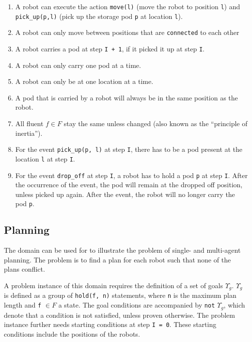 \documentclass[runningheads]{llncs}
\begin{document}
\begin{enumerate}%
        \item  A robot can execute the action \verb|move(l)| (move the robot to position \verb|l|) and \linebreak \verb|pick_up(p,l)| (pick up the storage pod \verb|p| at location \verb|l|).
        \item  A robot can only move between positions that are \verb|connected| to each other
        \item A robot carries a pod at step \verb|I + 1|, if it picked it up at step \verb|I|.
        \item A robot can only carry one pod at a time. 
        \item A robot can only be at one location at a time.
        \item A pod that is carried by a robot will always be in the same position as the robot.
        \item All fluent $f \in F$ stay the same unless changed (also known as the ``principle of inertia'').
        \item For the event \verb|pick_up(p, l)| at step  \verb|I|, there has to be a pod present at the location \verb|l| at step \verb|I|.
        \item For the event \verb|drop_off| at step \verb|I|, a robot has to hold a pod \verb|p| at step \verb|I|. After the occurrence of the event, the pod will remain at the dropped off position, unless picked up again. After the event, the robot will no longer carry the pod \verb|p|.
\end{enumerate}

\subsection{Planning} \label{subsec:planning}

The domain can be used for to illustrate the problem of single- and multi-agent planning. The problem is to find a plan for each robot such that none of the plans conflict.  

A problem instance of this domain requires the definition of a set of goals  $\Upsilon_g$. $\Upsilon_g$ is defined as a group of \verb|hold(f, n)| statements, where \verb|n| is the maximum plan length and \verb|f| $\in F$ a state. The goal conditions are accompanied by \verb|not| $\Upsilon_g$, which denote that a condition is not satisfied, unless proven otherwise. The problem instance further needs starting conditions at step \verb|I = 0|. These starting conditions include the positions of the robots. 
\end{document}
